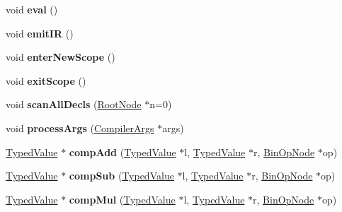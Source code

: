 \begin{DoxyCompactItemize}
void {\bfseries eval} ()
\item 
\mbox{\label{structante_1_1Compiler_ab257544d05193027c6b66956e5c2d0ad}} 
void {\bfseries emit\+IR} ()
\item 
\mbox{\label{structante_1_1Compiler_a807c820c343bd7b799762b7fb0b950f0}} 
void {\bfseries enter\+New\+Scope} ()
\item 
\mbox{\label{structante_1_1Compiler_a4f3dbb7ff9eb7b951b5efdd72bb0c7f9}} 
void {\bfseries exit\+Scope} ()
\item 
\mbox{\label{structante_1_1Compiler_acbb98f0ef7860dedf0b5fd5e2fba36ae}} 
void {\bfseries scan\+All\+Decls} (\hyperlink{structRootNode}{Root\+Node} $\ast$n=0)
\item 
\mbox{\label{structante_1_1Compiler_adb1aa46e48eb971322d6d77e251b8422}} 
void {\bfseries process\+Args} (\hyperlink{structante_1_1CompilerArgs}{Compiler\+Args} $\ast$args)
\item 
\mbox{\label{structante_1_1Compiler_a88af1760a02ac2afd42d23376bd6cc8a}} 
\hyperlink{structTypedValue}{Typed\+Value} $\ast$ {\bfseries comp\+Add} (\hyperlink{structTypedValue}{Typed\+Value} $\ast$l, \hyperlink{structTypedValue}{Typed\+Value} $\ast$r, \hyperlink{structBinOpNode}{Bin\+Op\+Node} $\ast$op)
\item 
\mbox{\label{structante_1_1Compiler_aef6a4b5a645b4e4973ca4d7cb0a21ce9}} 
\hyperlink{structTypedValue}{Typed\+Value} $\ast$ {\bfseries comp\+Sub} (\hyperlink{structTypedValue}{Typed\+Value} $\ast$l, \hyperlink{structTypedValue}{Typed\+Value} $\ast$r, \hyperlink{structBinOpNode}{Bin\+Op\+Node} $\ast$op)
\item 
\mbox{\label{structante_1_1Compiler_aa58e6bfd0838779b48964fd3a069f698}} 
\hyperlink{structTypedValue}{Typed\+Value} $\ast$ {\bfseries comp\+Mul} (\hyperlink{structTypedValue}{Typed\+Value} $\ast$l, \hyperlink{structTypedValue}{Typed\+Value} $\ast$r, \hyperlink{structBinOpNode}{Bin\+Op\+Node} $\ast$op)
\item 
\mbox{\label{structante_1_1Compiler_acb91108743866fb0c9a86b204bfcb540}} 

\end{DoxyCompactItemize}
